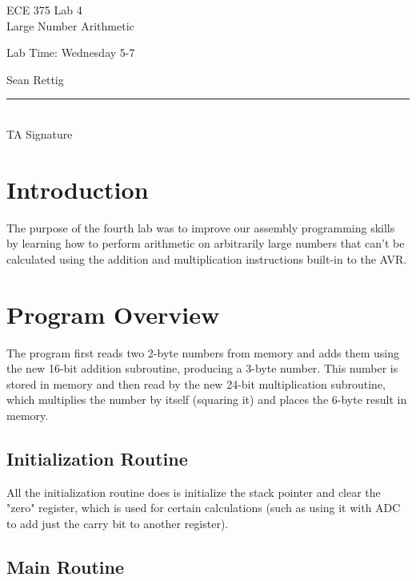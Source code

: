 \documentclass[12pt,letterpaper]{article}
\begin{document}
\begin{titlepage}
    \vspace*{4cm}
    \begin{flushright}
    {\huge
        ECE 375 Lab 4\\[1cm]
    }
    {\large
        Large Number Arithmetic
    }
    \end{flushright}
    \begin{flushleft}
    Lab Time: Wednesday 5-7
    \end{flushleft}
    \begin{flushright}
    Sean Rettig
    \vfill
    \rule{5in}{.5mm}\\
    TA Signature
    \end{flushright}

\end{titlepage}

\section{Introduction}

The purpose of the fourth lab was to improve our assembly programming skills by
learning how to perform arithmetic on arbitrarily large numbers that can't be
calculated using the addition and multiplication instructions built-in to the
AVR.

\section{Program Overview}

The program first reads two 2-byte numbers from memory and adds them using the
new 16-bit addition subroutine, producing a 3-byte number.  This number is
stored in memory and then read by the new 24-bit multiplication subroutine,
which multiplies the number by itself (squaring it) and places the 6-byte
result in memory.

\subsection{Initialization Routine}

All the initialization routine does is initialize the stack pointer and clear
the "zero" register, which is used for certain calculations (such as using it
with ADC to add just the carry bit to another register).

\subsection{Main Routine}
\end{document}
